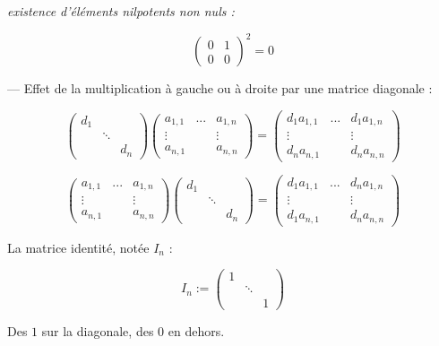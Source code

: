 \documentclass[class=report,crop=false]{standalone}
\begin{document}
{\it existence d'éléments nilpotents non nuls :}

\[\left(\begin{array}{cc}
0&1 \\
0&0
\end{array}\right)^2 = 0\]

--- Effet de la multiplication à gauche ou à droite par une matrice diagonale : 

\begin{equation}\label{eq:diagg}
\left( \begin{array}{ccc}
d_1 &&\\
&\ddots &\\
&&d_n
\end{array} \right) \left(\begin{array}{ccc}
a_{1,1}&...& a_{1,n}\\
\vdots &&\vdots\\
a_{n,1} && a_{n,n}
\end{array}\right) = \left(\begin{array}{ccc}
d_1a_{1,1}&...& d_1a_{1,n}\\
\vdots &&\vdots\\
d_na_{n,1} && d_na_{n,n}
\end{array}\right) \end{equation}

\begin{equation}\label{eq:diagd}
\left(\begin{array}{ccc}
a_{1,1}&...& a_{1,n}\\
\vdots &&\vdots\\
a_{n,1} && a_{n,n}
\end{array}\right) \left( \begin{array}{ccc}
d_1 &&\\
&\ddots &\\
&&d_n
\end{array} \right) = \left(\begin{array}{ccc}
d_1a_{1,1}&...& d_na_{1,n}\\
\vdots &&\vdots\\
d_1a_{n,1} && d_na_{n,n}
\end{array}\right) \end{equation}

\begin{definition}
La matrice identité, notée $I_n$ :

\[ I_n := \left(\begin{array}{ccc}
1 & &\\
& \ddots &\\
&&1
\end{array}\right)\]

\og Des $1$ sur la diagonale, des $0$ en dehors\fg .
\end{definition}
\end{document}
